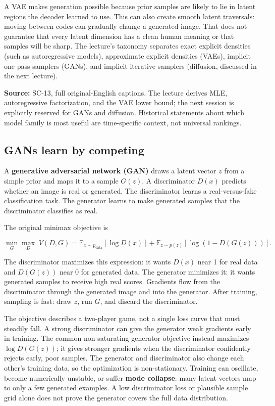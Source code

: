 A VAE makes generation possible because prior samples are likely to lie in latent regions the decoder learned to use. This can also create smooth latent traversals: moving between codes can gradually change a generated image. That does not guarantee that every latent dimension has a clean human meaning or that samples will be sharp. The lecture's taxonomy separates exact explicit densities (such as autoregressive models), approximate explicit densities (VAEs), implicit one-pass samplers (GANs), and implicit iterative samplers (diffusion, discussed in the next lecture).

\textbf{Source:} SC-13, full original-English captions. The lecture derives MLE, autoregressive factorization, and the VAE lower bound; the next session is explicitly reserved for GANs and diffusion. Historical statements about which model family is most useful are time-specific context, not universal rankings.

\subsection{GANs learn by competing}\label{04-visual-computing-ii-ch031-gans-learn-by-competing}

\hypertarget{04-visual-computing-ii-ch031-gans-learn-by-competing}{}

A \textbf{generative adversarial network (GAN)} draws a latent vector \(z\) from a simple prior and maps it to a sample \(G(z)\). A discriminator \(D(x)\) predicts whether an image is real or generated. The discriminator learns a real-versus-fake classification task. The generator learns to make generated samples that the discriminator classifies as real.

The original minimax objective is

\[
\min_G\max_D\;V(D,G)=
\mathbb{E}_{x\sim p_{\text{data}}}[\log D(x)]
+\mathbb{E}_{z\sim p(z)}[\log(1-D(G(z)))].
\]

The discriminator maximizes this expression: it wants \(D(x)\) near 1 for real data and \(D(G(z))\) near 0 for generated data. The generator minimizes it: it wants generated samples to receive high real scores. Gradients flow from the discriminator through the generated image and into the generator. After training, sampling is fast: draw \(z\), run \(G\), and discard the discriminator.

The objective describes a two-player game, not a single loss curve that must steadily fall. A strong discriminator can give the generator weak gradients early in training. The common non-saturating generator objective instead maximizes \(\log D(G(z))\); it gives stronger gradients when the discriminator confidently rejects early, poor samples. The generator and discriminator also change each other's training data, so the optimization is non-stationary. Training can oscillate, become numerically unstable, or suffer \textbf{mode collapse}: many latent vectors map to only a few generated examples. A low discriminator loss or plausible sample grid alone does not prove the generator covers the full data distribution.

